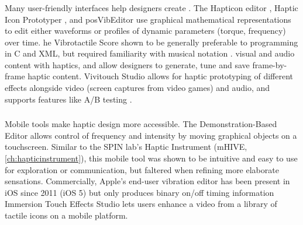 \subsubsection{}
Many user-friendly interfaces help designers create .
The Hapticon editor \cite{Enriquez2003}, Haptic Icon Prototyper \cite{Swindells2006}, and posVibEditor \cite{Ryu2008} use graphical mathematical representations to edit either waveforms or profiles of dynamic parameters (torque, frequency) over time.
he Vibrotactile Score \cite{Lee2009} shown to be generally preferable to programming in C and XML, but required familiarity with musical notation \cite{Lee2012}.
 visual and audio content with haptics, and allow designers to generate, tune and save frame-by-frame haptic content. 
Vivitouch Studio allows for haptic prototyping of different effects alongside video (screen captures from video games) and audio, and supports features like A/B testing \cite{Swindells2014}.



\subsubsection{}
Mobile tools make haptic design more accessible.
The Demonstration-Based Editor \cite{Hong2013} allows control of frequency and intensity by moving graphical objects on a touchscreen.
Similar to the SPIN lab's Haptic Instrument (mHIVE, \autoref{ch:hapticinstrument}), this mobile tool was shown to be intuitive and easy to use for exploration or communication, but faltered when refining more elaborate sensations. %
Commercially, Apple's end-user vibration editor has been present in iOS since 2011 (iOS 5) but only produces binary on/off timing information\osE{;}
Immersion Touch Effects Studio lets users enhance a video from a  library of tactile icons on a mobile platform.


